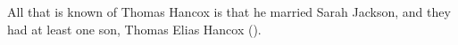 
All that is known of Thomas Hancox is that he married Sarah Jackson, and they had at least one son, Thomas Elias Hancox ().
